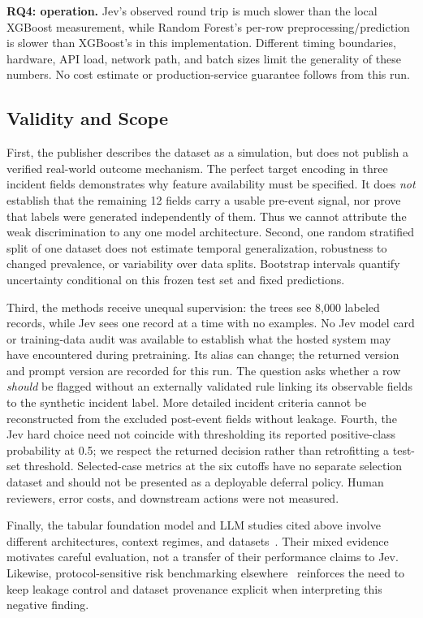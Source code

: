 \documentclass{llncs}
\begin{document}
\textbf{RQ4: operation.} Jev's observed round trip is much slower than the local XGBoost measurement, while Random Forest's per-row preprocessing/prediction is slower than XGBoost's in this implementation. Different timing boundaries, hardware, API load, network path, and batch sizes limit the generality of these numbers. No cost estimate or production-service guarantee follows from this run.

\subsection{Validity and Scope}

First, the publisher describes the dataset as a simulation, but does not publish a verified real-world outcome mechanism. The perfect target encoding in three incident fields demonstrates why feature availability must be specified. It does \emph{not} establish that the remaining 12 fields carry a usable pre-event signal, nor prove that labels were generated independently of them. Thus we cannot attribute the weak discrimination to any one model architecture. Second, one random stratified split of one dataset does not estimate temporal generalization, robustness to changed prevalence, or variability over data splits. Bootstrap intervals quantify uncertainty conditional on this frozen test set and fixed predictions.

Third, the methods receive unequal supervision: the trees see 8,000 labeled records, while Jev sees one record at a time with no examples. No Jev model card or training-data audit was available to establish what the hosted system may have encountered during pretraining. Its alias can change; the returned version and prompt version are recorded for this run. The question asks whether a row \emph{should} be flagged without an externally validated rule linking its observable fields to the synthetic incident label. More detailed incident criteria cannot be reconstructed from the excluded post-event fields without leakage. Fourth, the Jev hard choice need not coincide with thresholding its reported positive-class probability at 0.5; we respect the returned decision rather than retrofitting a test-set threshold. Selected-case metrics at the six cutoffs have no separate selection dataset and should not be presented as a deployable deferral policy. Human reviewers, error costs, and downstream actions were not measured.

Finally, the tabular foundation model and LLM studies cited above involve different architectures, context regimes, and datasets~\cite{hollmann2025tabpfn,grushina2026llmtab,garnelo2026tabular}. Their mixed evidence motivates careful evaluation, not a transfer of their performance claims to Jev. Likewise, protocol-sensitive risk benchmarking elsewhere~\cite{mishra2026erp,zeng2026fraudbench} reinforces the need to keep leakage control and dataset provenance explicit when interpreting this negative finding.
\end{document}
